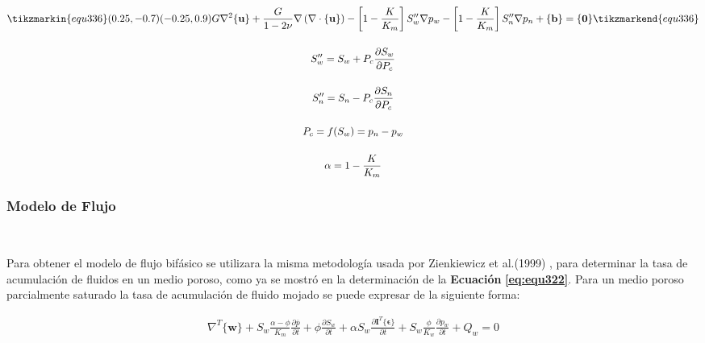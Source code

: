 \begin{ceqn} 
\begin{subequations} \label{eq:equ336} 
\begin{gather}
\tikzmarkin{equ336}(0.25,-0.7)(-0.25,0.9)
\normalsize{G\nabla^2 \{\mathbf{u}\}
+\frac{G}{1-2\nu} \nabla\left( \nabla\cdot \{\mathbf{u}\}\right)
- \left[1-\frac{K}{K_m}\right]S''_w\nabla p_w - \left[1-\frac{K}{K_m}\right]S''_n\nabla p_n + \{\mathbf{b}\} = \{\mathbf{0}\}}
\tikzmarkend{equ336}\label{eq:equ336a} \\[12pt]
S''_w = S_w + P_c\frac{\partial S_w}{\partial P_c}  \label{eq:equ336b} \\[12pt]
S''_n = S_n - P_c\frac{\partial S_n}{\partial P_c}  \label{eq:equ336c} \\[12pt]
P_c = \mathnormal{f}(S_w) = p_n - p_w  \label{eq:equ336d} \\[12pt]
\alpha=1-\frac{K}{K_m}  \label{eq:equ336e}
\end{gather}  
\end{subequations} 
\end{ceqn}


\subsubsection{Modelo de Flujo}~\hypertarget{sec:sec3322}{}
\label{sec:sec3322}

Para obtener el modelo de flujo bifásico se utilizara la misma metodología usada por Zienkiewicz et al.(1999) \cite{Zienkiewicz1999ComputationalGeomechanics}, para determinar la tasa de acumulación de fluidos en un medio poroso, como ya se mostró en la determinación de la \textbf{Ecuación} \textbf{\ref{eq:equ322}}. Para un medio poroso parcialmente saturado la tasa de acumulación de fluido mojado se puede expresar de la siguiente forma:
\bigskip
\begin{ceqn} %
\begin{gather}\label{eq:equ337}
\nabla^T \{\mathbf{w}\} + S_w \frac{\alpha - \phi}{K_m}\frac{\partial \overline{p}}{\partial t} + \phi\frac{\partial S_w}{\partial t} + \alpha S_w\frac{\partial\mathbf{I}^T \{\mathbf{\epsilon}\}}{\partial t} + S_w\frac{\phi}{K_w}\frac{\partial p_w}{\partial t} + Q_w= 0
\end{gather}   
\end{ceqn}
\bigskip

